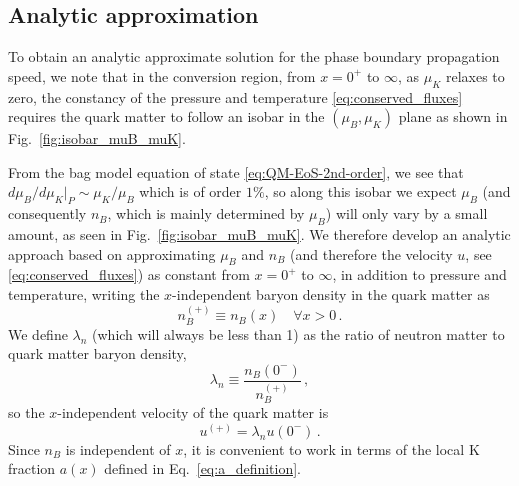 \documentclass[10pt,superscriptaddress,
amsmath,aps,prc,twocolumn,nofootinbib,floatfix]{revtex4-1}
\newcommand{\mga}[1]{{\color[rgb]{0.6,0,0}#1}}
\newcommand{\MeV}{\text{MeV}}
\newcommand{\Bratio}{\lambda_n}
\begin{document}
\subsection{Analytic approximation}
\label{sec:isothermal_analytic}

\mga{To obtain an analytic approximate solution for the phase boundary propagation speed, we note that in the conversion region, from $x=0^+$ to $\infty$, as $\mu_K$ relaxes to zero, the constancy of the pressure and temperature \eqref{eq:conserved_fluxes} requires}
the quark matter to follow an isobar in the $(\mu_B,\mu_K)$ plane as shown in Fig.~\ref{fig:isobar_muB_muK}.

\mga{From the bag model equation of state \eqref{eq:QM-EoS-2nd-order}, we see that $d\mu_B/d\mu_K|_P\sim \mu_K/\mu_B$ which is of order $1\%$, so along this isobar we expect $\mu_B$ (and consequently $n_B$, which is mainly determined by $\mu_B$) will only vary by a small amount, as seen in Fig.~\ref{fig:isobar_muB_muK}. We therefore
develop an analytic approach based on approximating $\mu_B$ and $n_B$ (and therefore the velocity $u$, see \eqref{eq:conserved_fluxes}) as constant
from $x=0^+$ to $\infty$, in addition to pressure and temperature, writing}
the $x$-independent baryon density in the quark matter as
\begin{equation}
n_B^{(+)} \equiv n_B(x) \quad \forall x>0 \,.
\label{eq:nBplus-def}
\end{equation}
We
define $\Bratio$ (which will always be less than 1) as the ratio of neutron matter to quark matter baryon density,
\begin{equation}
    \Bratio \equiv \dfrac{n_B(0^-)}{n_B^{(+)}} \,,
    \label{eq:lambda-def}
\end{equation}
so the $x$-independent velocity of the quark matter is
\begin{equation}
u^{(+)} =\Bratio u(0^-)\,.
\label{eq:uplus-def}
\end{equation}
Since $n_B$ is independent of $x$, it is convenient to work in terms of the local K fraction $a(x)$ defined in Eq.~\eqref{eq:a_definition}.
\end{document}
